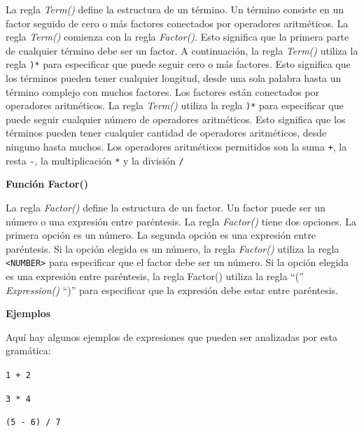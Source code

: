 \noindent La regla \textit{Term()} define la estructura de un término. Un término consiste en un factor seguido de cero o más factores conectados por operadores aritméticos. La regla \textit{Term()} comienza con la regla \textit{Factor()}. Esto significa que la primera parte de cualquier término debe ser un factor. A continuación, la regla \textit{Term()} utiliza la regla \lstinline|)*| para especificar que puede seguir cero o más factores. Esto significa que los términos pueden tener cualquier longitud, desde una sola palabra hasta un término complejo con muchos factores.
Los factores están conectados por operadores aritméticos. La regla \textit{Term()} utiliza la regla \lstinline|)*| para especificar que puede seguir cualquier número de operadores aritméticos. Esto significa que los términos pueden tener cualquier cantidad de operadores aritméticos, desde ninguno hasta muchos.
Los operadores aritméticos permitidos son la suma \lstinline|+|, la resta \lstinline|-|, la multiplicación \lstinline|*| y la división \lstinline|/|

\phantom{text}

\noindent \textbf{Función Factor()}

\phantom{text}

\lstset{inputencoding=utf8/latin1}

\noindent La regla \textit{Factor()} define la estructura de un factor. Un factor puede ser un número o una expresión entre paréntesis. La regla \textit{Factor()} tiene dos opciones. La primera opción es un número. La segunda opción es una expresión entre paréntesis. Si la opción elegida es un número, la regla \textit{Factor()} utiliza la regla \lstinline|<NUMBER>| para especificar que el factor debe ser un número. Si la opción elegida es una expresión entre paréntesis, la regla Factor() utiliza la regla ``('' \textit{Expression()} ``)'' para especificar que la expresión debe estar entre paréntesis.

\phantom{text}

\noindent \textbf{Ejemplos}

\phantom{text}

\noindent Aquí hay algunos ejemplos de expresiones que pueden ser analizadas por esta gramática:

\begin{center}
	\lstinline|1 + 2|

	\lstinline|3 * 4|

	\lstinline|(5 - 6) / 7|
\end{center}

